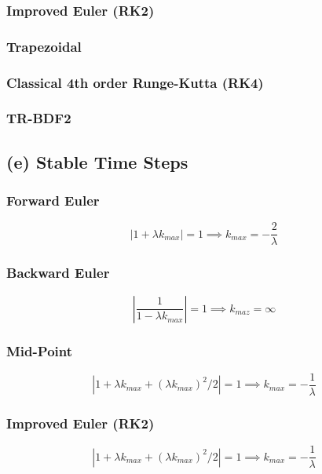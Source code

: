 \documentclass{article}
\begin{document}
\subsubsection*{Improved Euler (RK2)}

\subsubsection*{Trapezoidal}

\subsubsection*{Classical 4th order Runge-Kutta (RK4)}

\subsubsection*{TR-BDF2}

\subsection*{(e) Stable Time Steps}
\subsubsection*{Forward Euler}
\begin{equation}
|1+\lambda k_{max}|=1\implies k_{max}=-\frac{2}{\lambda}
\end{equation}

\subsubsection*{Backward Euler}
\begin{equation}
|\frac{1}{1-\lambda k_{max}}|=1\implies k_{maz}=\infty
\end{equation}

\subsubsection*{Mid-Point}
\begin{equation}
|1+\lambda k_{max}+(\lambda k_{max})^2/2|=1\implies k_{max}=-\frac{1}{\lambda}
\end{equation}

\subsubsection*{Improved Euler (RK2)}
\begin{equation}
|1+\lambda k_{max}+(\lambda k_{max})^2/2|=1\implies k_{max}=-\frac{1}{\lambda}
\end{equation}
\end{document}
